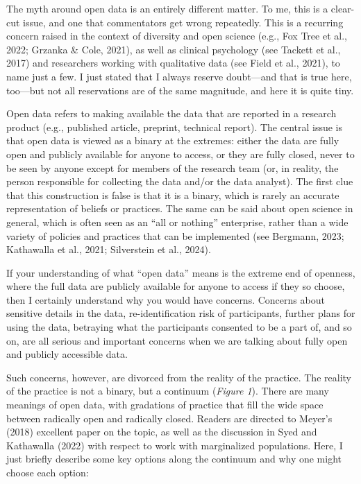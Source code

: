 \documentclass[authordate, empirical,issue]{jote-new-article}
\begin{document}
The myth around open data is an entirely different matter. To me, this is a clear-cut issue, and one that commentators get wrong repeatedly. This is a recurring concern raised in the context of diversity and open science (e.g., Fox Tree et al., 2022; Grzanka \& Cole, 2021), as well as clinical psychology (see Tackett et al., 2017) and researchers working with qualitative data (see Field et al., 2021), to name just a few. I just stated that I always reserve doubt—and that is true here, too—but not all reservations are of the same magnitude, and here it is quite tiny.







Open data refers to making available the data that are reported in a research product (e.g., published article, preprint, technical report). The central issue is that open data is viewed as a binary at the extremes: either the data are fully open and publicly available for anyone to access, or they are fully closed, never to be seen by anyone except for members of the research team (or, in reality, the person responsible for collecting the data and/or the data analyst). The first clue that this construction is false is that it is a binary, which is rarely an accurate representation of beliefs or practices. The same can be said about open science in general, which is often seen as an “all or nothing” enterprise, rather than a wide variety of policies and practices that can be implemented (see Bergmann, 2023; Kathawalla et al., 2021; Silverstein et al., 2024).







If your understanding of what “open data” means is the extreme end of openness, where the full data are publicly available for anyone to access if they so choose, then I certainly understand why you would have concerns. Concerns about sensitive details in the data, re-identification risk of participants, further plans for using the data, betraying what the participants consented to be a part of, and so on, are all serious and important concerns when we are talking about fully open and publicly accessible data.







Such concerns, however, are divorced from the reality of the practice. The reality of the practice is not a binary, but a continuum (\emph{Figure 1}). There are many meanings of open data, with gradations of practice that fill the wide space between radically open and radically closed. Readers are directed to Meyer’s (2018) excellent paper on the topic, as well as the discussion in Syed and Kathawalla (2022) with respect to work with marginalized populations. Here, I just briefly describe some key options along the continuum and why one might choose each option:
\end{document}
